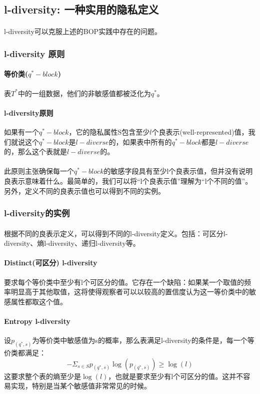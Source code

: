 \documentclass[12pt,a4paper]{article}
\begin{document}
\subsection{l-diversity: 一种实用的隐私定义}
\paragraph{} l-diversity可以克服上述的BOP实践中存在的问题。

\subsubsection{l-diversity 原则}
\paragraph{等价类($q^*-block$)} 表$T^*$中的一组数据，他们的非敏感值都被泛化为$q^*$。
\paragraph{l-diversity原则} 如果有一个$q^*-block$，它的隐私属性S包含至少$l$个良表示(well-represented)值，我们就说这个$q^*-block$是$l-diverse$的，如果表中所有的$q^*-block$都是$l-diverse$的，那么这个表就是$l-diverse$的。
\paragraph{} 此原则主张确保每一个$q^*-block$的敏感字段具有至少l个良表示值，但并没有说明良表示意味着什么。最简单的，我们可以将“l个良表示值”理解为“l个不同的值”。另外，定义不同的良表示值也可以得到不同的实例。
\subsubsection{l-diversity的实例}
\paragraph{} 根据不同的良表示定义，可以得到不同的l-diversity定义。包括：可区分l-diversity、熵l-diversity、递归l-diversity等。

\paragraph{Distinct(可区分) l-diversity} 要求每个等价类中至少有l个可区分的值。它存在一个缺陷：如果某一个取值的频率明显高于其他取值，这将使得观察者可以以较高的置信度认为这一等价类中的敏感属性都取这个值。

\paragraph{Entropy l-diversity} 设$p_(q^*,s)$为等价类中敏感值为s的概率，那么表满足l-diversity的条件是，每一个等价类都满足：
\begin{equation}
	- \Sigma_{s \in S} p_(q^*,s) \log(p_(q^*,s)) \geq \log(l)
\end{equation}
这要求整个表的熵至少是$\log(l)$，也就是要求至少有l个可区分的值。这并不容易实现，特别是当某个敏感值非常常见的时候。
\end{document}
